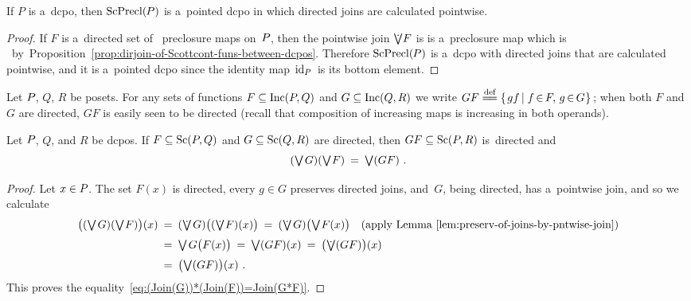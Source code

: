 \documentclass[11pt,letterpaper]{article}
\renewcommand{\thmskip}{\bigskip}
\renewcommand{\interskip}{\medskip}
\begin{document}
\thmskip

\begin{corollary}\label{cor:P-dcpo==>ScPreCl(P)-dcpo-pntwise-joins}
If $P$ is a~dcpo,
then $\mathop{\smash{\mathrm{ScPrecl}}}\nolimits(\mspace{-1mu} P)$ is a~pointed dcpo in which directed joins are calculated pointwise.
\end{corollary}

\interskip

\begin{proof}
If $F$ is a~directed set of \Scottcont\ preclosure maps on~$P\mspace{-1mu}$,
then the pointwise join $\dottJoin\!F$ is is a~preclosure map
which is \Scottcont\ by~Proposition~\ref{prop:dirjoin-of-Scottcont-funs-between-dcpos}.
Therefore $\mathop{\smash{\mathrm{ScPrecl}}}\nolimits(\mspace{-1mu} P)$ is a~dcpo with directed joins that are calculated pointwise,
and it is a~pointed dcpo since the identity map $\mspace{2mu}\mathrm{id}_P\mspace{2mu}$ is its bottom element.
\end{proof}

\pagebreak[3]
\thmskip

Let $P\mspace{-1mu}$, $Q$, $R$ be posets.
For any sets of functions $F\subseteq\mathop{\smash{\mathrm{Inc}}}\nolimits(P,Q)$ and $G\subseteq\mathop{\smash{\mathrm{Inc}}}\nolimits(Q,R)$
we write
	$GF \mspace{-1mu}\mathrel{\overset{\text{def}}{\mspace{1mu}=\!=\mspace{1mu}}}\mspace{-1mu} \{ \mspace{2mu} gf\mspace{-2mu}\mid
					f\mspace{-2mu}\in\mspace{-2mu} F,\, g\mspace{-2mu}\in\mspace{-2mu} G\mspace{1mu} \}\mspace{2mu}$;
when both $F$ and $G$ are directed, $GF$ is easily seen to be directed
	(recall that composition of increasing maps is increasing in both operands).

\thmskip

\begin{proposition}\label{prop:composing-Sc(P,Q)-and-Sc(Q,R)}
Let\/ $P\mspace{-1mu}$, $Q$, and\/ $R$ be dcpos.
If\/ $F\subseteq\mathop{\smash{\mathrm{Sc}}}\nolimits(P,Q)$ and\/ $G\subseteq\mathop{\smash{\mathrm{Sc}}}\nolimits(Q,R)$ are directed,
then\/ $GF \subseteq \mathop{\smash{\mathrm{Sc}}}\nolimits(P,R)$ is~directed and
%
\begin{equation}\label{eq:(Join(G))*(Join(F))=Join(G*F)}
(\tJoin\negtinysp G)(\tJoin\negdtinysp F)	\Eq \tJoin(GF)~.
\end{equation}
%
\end{proposition}


\begin{proof}
Let $x\in P\mspace{-1mu}$.
The set $F(x)$ is directed,
every $g\in G$ preserves directed joins,
and~$G$, being directed, has a~pointwise join,
and so we calculate
%
\begin{align*}
\bigl((\tJoin\negtinysp G)(\tJoin\negdtinysp F)\bigr)(x)
	&\Eq (\dottJoin\negtinysp G)\bigl((\dottJoin\negdtinysp F)(x)\bigr)
	    \Eq (\dottJoin\negtinysp G)\bigl(\tJoin\negdtinysp F(x)\bigr)
		\quad\text{(apply Lemma~\ref{lem:preserv-of-joins-by-pntwise-join})} \\[.5ex]
	&\Eq \tJoin\negtinysp G\bigl(F(x)\bigr)
	    \Eq \tJoin (GF)(x)
	    \Eq \bigl(\dottJoin(GF)\bigr)(x) \\[.5ex]
	&\Eq \bigl(\tJoin(GF)\bigr)(x)~.
\end{align*}
%
This proves the equality~\eqref{eq:(Join(G))*(Join(F))=Join(G*F)}.
\end{proof}
\end{document}
